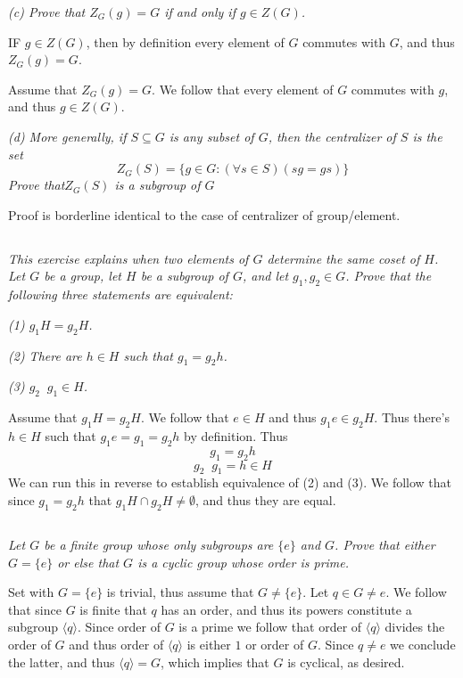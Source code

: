 \documentclass[11pt,oneside,titlepage]{book}
\DeclareMathOperator \inv {^{-1}}
\newcommand{\eangle}[1]{\langle #1 \rangle}
\newcommand{\set}[1]{\{ #1 \}}
\begin{document}
\textit{(c) Prove that $Z_G(g) = G$ if and only if $g \in Z(G)$.}

IF $g \in Z(G)$, then by definition every element of $G$ commutes
with $G$, and thus $Z_G(g) = G$.

Assume that $Z_G(g) = G$. We follow that every element of $G$ commutes
with $g$, and thus $g \in Z(G)$.

\textit{(d) More generally, if $S \subseteq G$ is any subset of $G$,
then the centralizer of $S$ is the set
  $$Z_G(S) = \set{g \in G: (\forall s \in S)(sg = gs)}$$
  Prove that$ Z_G(S)$ is a subgroup of $G$ }

Proof is borderline identical to the case of centralizer of
group/element.

\subsection{}

\textit{This exercise explains when two elements of $G$ determine the
  same coset of $H$. Let $G$ be a group, let $H$ be a subgroup of $G$,
  and let $g_1, g_2 \in G$. Prove that the following three statements
  are equivalent:}

\textit{(1) $g_1 H = g_2 H$. }

\textit{(2) There are $h \in H$ such that $g_1 = g_2 h$. }

\textit{(3) $g_2\inv g_1 \in H$. }

Assume that $g_1 H = g_2 H$. We follow that $e \in H$ and thus
$g_1 e \in g_2 H$. Thus there's $h \in H$ such that $g_1 e = g_1 = g_2 h$
by definition. Thus
$$g_1 = g_2 h$$
$$g_2 \inv g_1 = h \in H$$
We can run this in reverse to establish equivalence of (2) and (3).
We follow that since $g_1 = g_2 h$ that $g_1 H \cap g_2 H \neq \emptyset$,
and thus they are equal.

\subsection{}

\textit{Let $G$ be a finite group whose only subgroups are $\set{e}$
and $G$.  Prove that either $G = \set{e}$ or else that $G$ is a cyclic
group whose order is prime.}

Set with $G = \set{e}$ is trivial, thus assume that $G \neq \set{e}$.
Let $q \in G \neq e$. We follow that since $G$ is finite that $q$ has
an order, and thus its powers constitute a subgroup
$\eangle{q}$. Since order of $G$ is a prime we follow that order of
$\eangle{q}$ divides the order of $G$ and thus order of  $\eangle{q}$ is
either $1$ or order of $G$. Since $q \neq e$ we conclude the latter,
and thus $\eangle{q} = G$, which implies that $G$ is cyclical, as desired.
\end{document}
